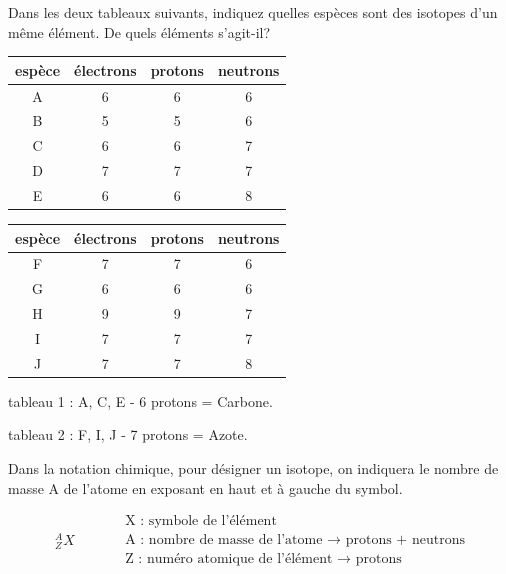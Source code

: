 \documentclass[
  11pt,
  a4paper,
  openany]{book}
\begin{document}
\begin{Exercise}
Dans les deux tableaux suivants, indiquez quelles espèces sont des isotopes d'un même élément. De quels éléments s'agit-il?

\end{Exercise}

\begin{longtable}[]{@{}cccc@{}}
\toprule\noalign{}
espèce & électrons & protons & neutrons \\
\midrule\noalign{}
\endhead
\bottomrule\noalign{}
\endlastfoot
A & 6 & 6 & 6 \\
B & 5 & 5 & 6 \\
C & 6 & 6 & 7 \\
D & 7 & 7 & 7 \\
E & 6 & 6 & 8 \\
\end{longtable}

\begin{longtable}[]{@{}cccc@{}}
\toprule\noalign{}
espèce & électrons & protons & neutrons \\
\midrule\noalign{}
\endhead
\bottomrule\noalign{}
\endlastfoot
F & 7 & 7 & 6 \\
G & 6 & 6 & 6 \\
H & 9 & 9 & 7 \\
I & 7 & 7 & 7 \\
J & 7 & 7 & 8 \\
\end{longtable}

\begin{Answer}

tableau 1 : A, C, E - 6 protons = Carbone.

tableau 2 : F, I, J - 7 protons = Azote.

\newpage

\end{Answer}

Dans la notation chimique, pour désigner un isotope, on indiquera le nombre de masse A de l'atome en exposant en haut et à gauche du symbol.

\[ \begin{split}
  _{Z}^{A}X
  \end{split}
  \qquad
  \begin{split}
  & \text{X : symbole de l'élément} \\
    & \text{A : nombre de masse de l'atome $\rightarrow$ protons + neutrons} \\
    & \text{Z : numéro atomique de l'élément $\rightarrow$ protons}
  \end{split} \]
\end{document}
